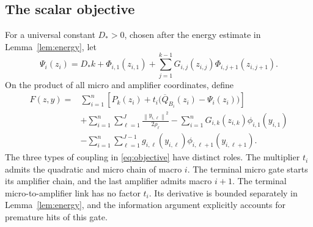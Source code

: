 \documentclass[11pt]{article}
\theoremstyle{definition}
\theoremstyle{remark}
\newcommand{\norm}[1]{\left\|#1\right\|}
\begin{document}
\subsection{The scalar objective}
For a universal constant $D_*>0$, chosen after the energy estimate in Lemma~\ref{lem:energy}, let
\begin{equation}\label{eq:Psi}
 \Psi_i(z_i)=D_*k+\Phi_{i,1}(z_{i,1})
       +\sum_{j=1}^{k-1}G_{i,j}(z_{i,j})\Phi_{i,j+1}(z_{i,j+1}).
\end{equation}
On the product of all micro and amplifier coordinates, define
\begin{align}\label{eq:objective}
 F(z,y)={}&\sum_{i=1}^n
 \left[P_k(z_i)+t_i\big(\overline Q_{B_i}(z_i)-\Psi_i(z_i)\big)\right]\\
 &+\sum_{i=1}^n\sum_{\ell=1}^J\frac{\norm{y_{i,\ell}}^2}{2\rho_\ell}
 -\sum_{i=1}^nG_{i,k}(z_{i,k})\phi_{i,1}(y_{i,1})\nonumber\\
 &-\sum_{i=1}^n\sum_{\ell=1}^{J-1}
       g_{i,\ell}(y_{i,\ell})\phi_{i,\ell+1}(y_{i,\ell+1}).\nonumber
\end{align}
The three types of coupling in \eqref{eq:objective} have distinct roles.
The multiplier $t_i$ admits the quadratic and micro chain of macro $i$.
The terminal micro gate starts its amplifier chain, and the last amplifier
admits macro $i+1$. The terminal micro-to-amplifier link has no factor
$t_i$. Its derivative is bounded separately in Lemma~\ref{lem:energy},
and the information argument explicitly accounts for premature hits
of this gate.
\end{document}
